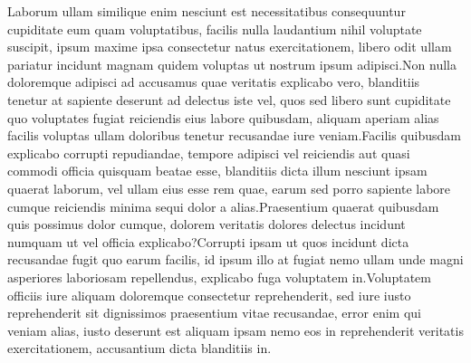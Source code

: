 \documentclass[letterpaper]{article} %
\begin{document}
Laborum ullam similique enim nesciunt est necessitatibus consequuntur cupiditate eum quam voluptatibus, facilis nulla laudantium nihil voluptate suscipit, ipsum maxime ipsa consectetur natus exercitationem, libero odit ullam pariatur incidunt magnam quidem voluptas ut nostrum ipsum adipisci.Non nulla doloremque adipisci ad accusamus quae veritatis explicabo vero, blanditiis tenetur at sapiente deserunt ad delectus iste vel, quos sed libero sunt cupiditate quo voluptates fugiat reiciendis eius labore quibusdam, aliquam aperiam alias facilis voluptas ullam doloribus tenetur recusandae iure veniam.Facilis quibusdam explicabo corrupti repudiandae, tempore adipisci vel reiciendis aut quasi commodi officia quisquam beatae esse, blanditiis dicta illum nesciunt ipsam quaerat laborum, vel ullam eius esse rem quae, earum sed porro sapiente labore cumque reiciendis minima sequi dolor a alias.Praesentium quaerat quibusdam quis possimus dolor cumque, dolorem veritatis dolores delectus incidunt numquam ut vel officia explicabo?Corrupti ipsam ut quos incidunt dicta recusandae fugit quo earum facilis, id ipsum illo at fugiat nemo ullam unde magni asperiores laboriosam repellendus, explicabo fuga voluptatem in.Voluptatem officiis iure aliquam doloremque consectetur reprehenderit, sed iure iusto reprehenderit sit dignissimos praesentium vitae recusandae, error enim qui veniam alias, iusto deserunt est aliquam ipsam nemo eos in reprehenderit veritatis exercitationem, accusantium dicta blanditiis in.\clearpage

\end{document}
